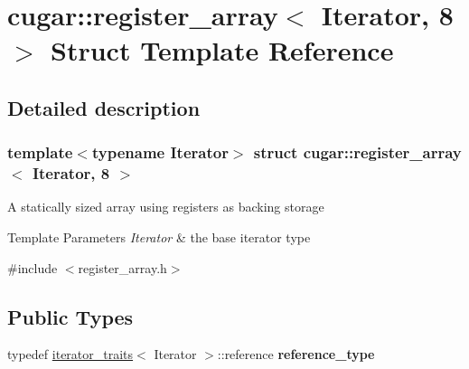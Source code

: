 \hypertarget{structcugar_1_1register__array_3_01_iterator_00_018_01_4}{}\section{cugar\+:\+:register\+\_\+array$<$ Iterator, 8 $>$ Struct Template Reference}
\label{structcugar_1_1register__array_3_01_iterator_00_018_01_4}


\subsection{Detailed description}
\subsubsection*{template$<$typename Iterator$>$\newline
struct cugar\+::register\+\_\+array$<$ Iterator, 8 $>$}

A statically sized array using registers as backing storage


\begin{DoxyTemplParams}{Template Parameters}
{\em Iterator} & the base iterator type \\
\hline
\end{DoxyTemplParams}


{\ttfamily \#include $<$register\+\_\+array.\+h$>$}

\subsection*{Public Types}
\begin{DoxyCompactItemize}
\item 
\mbox{\label{structcugar_1_1register__array_3_01_iterator_00_018_01_4_a2a43e85c295e17b1e90a5253fa291665}} 
typedef \hyperlink{structcugar_1_1iterator__traits}{iterator\+\_\+traits}$<$ Iterator $>$\+::reference {\bfseries reference\+\_\+type}
\end{DoxyCompactItemize}
